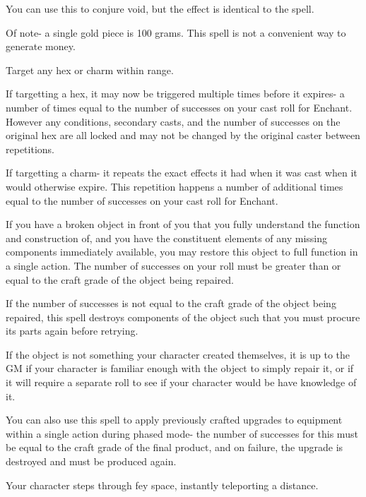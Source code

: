 \begin{GRPtablewide}
{		You can use this to conjure void, but the effect is identical to the  spell.

		Of note- a single gold piece is 100 grams. This spell is not a convenient way to generate money.
	}

	{%
		Target any hex or charm within range.

		If targetting a hex, it may now be triggered multiple times before it expires- a number of times equal to the number of successes on your cast roll for Enchant. However any conditions, secondary casts, and the number of successes on the original hex are all locked and may not be changed by the original caster between repetitions.

		If targetting a charm- it repeats the exact effects it had when it was cast when it would otherwise expire. This repetition happens a number of additional times equal to the number of successes on your cast roll for Enchant.
	}

	{%
		If you have a broken object in front of you that you fully understand the function and construction of, and you have the constituent elements of any missing components immediately available, you may restore this object to full function in a single action. The number of successes on your roll must be greater than or equal to the craft grade of the object being repaired.

		If the number of successes is not equal to the craft grade of the object being repaired, this spell destroys components of the object such that you must procure its parts again before retrying.

		If the object is not something your character created themselves, it is up to the GM if your character is familiar enough with the object to simply repair it, or if it will require a separate  roll to see if your character would be have knowledge of it.

		You can also use this spell to apply previously crafted upgrades to equipment within a single action during phased mode- the number of successes for this must be equal to the craft grade of the final product, and on failure, the upgrade is destroyed and must be produced again.
	}

	{%
		Your character steps through fey space, instantly teleporting a distance.

}
\end{GRPtablewide}
